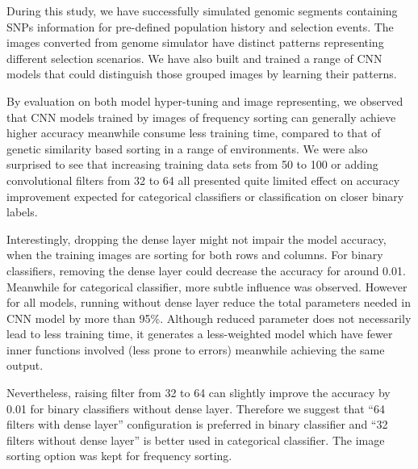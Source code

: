 \documentclass[a4paper,12pt,oneside]{extarticle}
\begin{document}
During this study, we have successfully simulated genomic segments containing SNPs information for pre-defined population history and selection events. The images converted from genome simulator have distinct patterns representing different selection scenarios. We have also built and trained a range of CNN models that could distinguish those grouped images by learning their patterns. 
\par
By evaluation on both model hyper-tuning and image representing, we observed that CNN models trained by images of frequency sorting can generally achieve higher accuracy meanwhile consume less training time, compared to that of genetic similarity based sorting in a range of environments. We were also surprised to see that increasing training data sets from 50 to 100 or adding convolutional filters from 32 to 64 all presented quite limited effect on accuracy improvement expected for categorical classifiers or classification on closer binary labels.
\par
Interestingly, dropping the dense layer might not impair the model accuracy, when the training images are sorting for both rows and columns. For binary classifiers, removing the dense layer could decrease the accuracy for around 0.01. Meanwhile for categorical classifier, more subtle influence was observed. However for all models, running without dense layer reduce the total parameters needed in CNN model by more than 95\%. Although reduced parameter does not necessarily lead to less training time, it generates a less-weighted model which have fewer inner functions involved (less prone to errors) meanwhile achieving the same output. 

\par
Nevertheless, raising filter from 32 to 64 can slightly improve the accuracy by 0.01 for binary classifiers without dense layer. Therefore we suggest that “64 filters with dense layer” configuration is preferred in binary classifier and “32 filters without dense layer” is better used in categorical classifier. The image sorting option was kept for frequency sorting.
\end{document}
